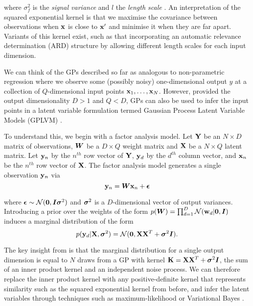  where $\sigma_f^2$ is the \emph{signal variance} and $l$ the \emph{length scale} \cite{rasmussen2006gaussian}. An interpretation of the squared exponential kernel is that we maximise the covariance between observations when ${\bf x}$ is close to ${\bf x}'$ and minimise it when they are far apart. Variants of this kernel exist, such as that incorporating an automatic relevance determination (ARD) structure by allowing different length scales for each input dimension.

 We can think of the GPs described so far as analogous to non-parametric regression where we observe some (possibly noisy) one-dimensional output $y$ at a collection of $Q$-dimensional input points ${\bf x}_1, \ldots, {\bf x}_N$. However, provided the output dimensionality $D > 1$ and $Q < D$, GPs can also be used to infer the input points in a latent variable formulation termed Gaussian Process Latent Variable Models (GPLVM) \cite{Lawrence2005-cu}.

 To understand this, we begin with a factor analysis model. Let ${\bf Y}$ be an $N \times D$ matrix of observations, ${\bm W}$ be a $D \times Q$ weight matrix and ${\bf X}$ be a $N \times Q$ latent matrix. Let ${\bf y}_n$ by the $n^{th}$ row vector of ${\bf Y}$, ${\bf y}_d$ by the $d^{th}$ column vector, and ${\bf x}_n$ be the $n^{th}$ row vector of ${\bf X}$. The factor analysis model generates a single observation ${\bf y}_n$ via
 \begin{equation}
 	{\bf y}_n = {\bm W} {\bf x}_n + {\bm\epsilon}
 \end{equation}

 where ${\bm \epsilon} \sim \mathcal{N}({\bm 0}, {\bm I} {\bm \sigma}^2)$ and ${\bm \sigma}^2$ is a $D$-dimensional vector of output variances. Introducing a prior over the weights of the form $p({\bm W}) = \prod_{d=1}^D \mathcal{N}({\bf w}_d| {\bm 0}, {\bm I})$ induces a marginal distribution of the form
 \begin{equation}
 	p({\bf y}_d | {\bf X}, {\bm \sigma}^2) = \mathcal{N}({\bm 0}, {\bf X} {\bf X}^T + {\bm \sigma}^2 {\bm I}).
 \end{equation}

The key insight from \cite{Lawrence2005-cu} is that the marginal distribution for a single output dimension is equal to $N$ draws from a GP with kernel ${\bf K} = {\bf X} {\bf X}^T + {\bm \sigma}^2 {\bm I}$, the sum of an inner product kernel and an independent noise process. We can therefore replace the inner product kernel with any positive-definite kernel that represents similarity such as the squared exponential kernel from before, and infer the latent variables through techniques such as maximum-likelihood \cite{Lawrence2005-cu} or Variational Bayes \cite{titsias2009variational}.

